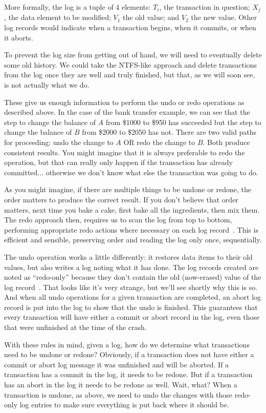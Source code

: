 \documentclass[a4paper]{report}
\begin{document}
More formally, the log is a tuple of 4 elements: $T_{i}$, the transaction in question; $X_{j}$, the data element to be modified; $V_{1}$ the old value; and $V_{2}$ the new value. Other log records would indicate when a transaction begins, when it commits, or when it aborts. 

To prevent the log size from getting out of hand, we will need to eventually delete some old history. We could take the NTFS-like approach and delete transactions from the log once they are well and truly finished, but that, as we will soon see, is not actually what we do. 

These give us enough information to perform the undo or redo operations as described above. In the case of the bank transfer example, we can see that the step to change the balance of $A$ from \$1000 to \$950 has succeeded but the step to change the balance of $B$ from \$2000 to \$2050 has not. There are two valid paths for proceeding: undo the change to $A$ OR redo the change to $B$. Both produce consistent results. You might imagine that it is always preferable to redo the operation, but that can really only happen if the transaction has already committed... otherwise we don't know what else the transaction was going to do.

As you might imagine, if there are multiple things to be undone or redone, the order matters to produce the correct result. If you don't believe that order matters, next time you bake a cake, first bake all the ingredients, then mix them. The redo approach then, requires us to scan the log from top to bottom, performing appropriate redo actions where necessary on each log record~\cite{dsc}. This is efficient and sensible, preserving order and reading the log only once, sequentially.

The undo operation works a little differently: it restores data items to their old values, but also writes a log noting what it has done. The log records created are noted as ``redo-only'' because they don't contain the old (now-erased) value of the log record~\cite{dsc}. That looks like it's very strange, but we'll see shortly why this is so. And when all undo operations for a given transaction are completed, an abort log record is put into the log to show that the undo is finished. This guarantees that every transaction will have either a commit or abort record in the log, even those that were unfinished at the time of the crash.

With these rules in mind, given a log, how do we determine what transactions need to be undone or redone? Obviously, if a transaction does not have either a commit or abort log message it was unfinished and will be aborted. If a transaction has a commit in the log, it needs to be redone. But if a transaction has an abort in the log it needs to be redone as well. Wait, what? When a transaction is undone, as above, we need to undo the changes with those redo-only log entries to make sure everything is put back where it should be.
\end{document}
